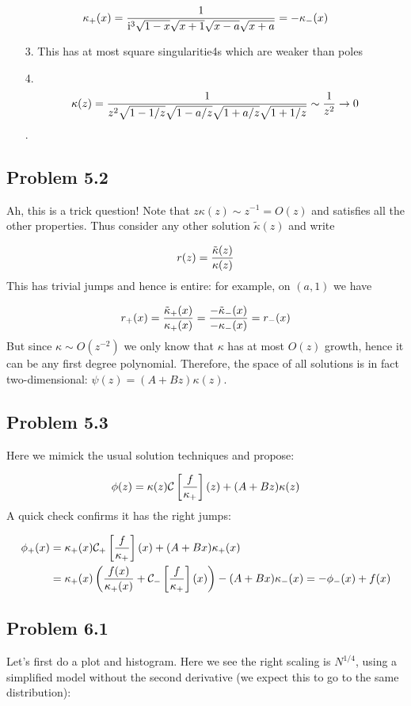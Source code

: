 \documentclass[12pt,landscape]{article}
\def\I{ {\rm i} }
\def\CC{ {\cal C} }
\def\br[#1]{\left[{#1}\right]}
\begin{document}
{\[
\kappa_+(x) = {1 \over \I^3 \sqrt{1-x}\sqrt{x+1}\sqrt{x-a}\sqrt{x+a}} =  -\kappa_-(x)
\]
\begin{itemize}
\item[3. ] This has at most square singularitie4s which are weaker than poles


\item[4. ] \[
\kappa(z) = {1 \over z^2 \sqrt{1-1/z}\sqrt{1-a/z} \sqrt{1+a/z} \sqrt{1+1/z}} \sim {1 \over z^2} \rightarrow 0
\]
.

\end{itemize}
\subsection{Problem 5.2}
Ah, this is a trick question! Note that $z \kappa(z) \sim z^{-1} = O(z)$ and satisfies all the other properties. Thus consider any other solution $\tilde \kappa(z)$ and write

\[
r(z) = {\tilde \kappa(z) \over \kappa(z) }
\]
This has trivial jumps and hence is entire: for example, on $(a,1)$ we have

\[
r_+(x) = {\tilde \kappa_+(x) \over \kappa_+(x) }  = {-\tilde \kappa_-(x) \over -\kappa_-(x) }  = r_-(x)
\]
But since $\kappa \sim O(z^{-2})$ we only know that $\kappa$ has at most $O(z)$ growth, hence it can be any first degree polynomial.  Therefore, the space of all solutions is in fact two-dimensional: $\psi(z) = (A + Bz) \kappa(z)$.

\subsection{Problem 5.3}
Here we mimick the usual solution techniques and propose:

\[
\phi(z) = \kappa(z) \CC\br[{f \over \kappa_+}](z) + (A+Bz) \kappa(z)
\]
A quick check confirms it has the right jumps:

\begin{align*}
\phi_+(x) &= \kappa_+(x) \CC_+\br[{f \over \kappa_+}](x) + (A+Bx) \kappa_+(x)\\
& =\kappa_+(x) \left({f(x) \over \kappa_+(x)} + \CC_-\br[{f \over \kappa_+}](x)\right) - (A+Bx) \kappa_-(x) = -\phi_-(x) + f(x)
\end{align*}
\newpage
\subsection{Problem 6.1}
Let's first do a plot and histogram. Here we see the right scaling is $N^{1/4}$, using a simplified model without the second derivative (we expect this to go to the same distribution):


}
\end{document}

